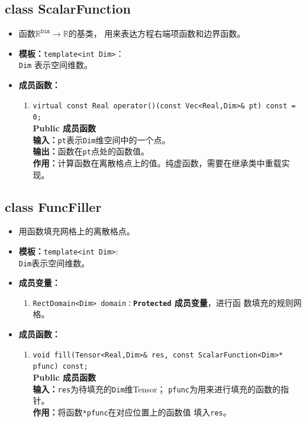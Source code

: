 \documentclass[a4paper,twoside]{ctexart}
\begin{document}
\subsection*{class ScalarFunction}
\begin{itemize}
    \item 函数$\mathbb{R}^{\texttt{Dim}}\rightarrow\mathbb{R}$的基类，
      用来表达方程右端项函数和边界函数。
    \item \textbf{模板：}\texttt{template<int Dim>}：\\\texttt{Dim} 表示空间维数。
    \item \textbf{成员函数：}
            \begin{enumerate}[(1)]
                \item \texttt{virtual const Real operator()(const Vec<Real,Dim>\& pt) const = 0;}\\
                \textbf{Public 成员函数}\\
                \textbf{输入：}\texttt{pt}表示\texttt{Dim}维空间中的一个点。\\
                \textbf{输出：}函数在\texttt{pt}点处的函数值。\\
                \textbf{作用：}计算函数在离散格点上的值。纯虚函数，需要在继承类中重载实现。
         
            \end{enumerate}
\end{itemize}

\subsection*{class FuncFiller}
\begin{itemize}
    \item 用函数填充网格上的离散格点。
    \item \textbf{模板：}\texttt{template<int Dim>}:\\
      \texttt{Dim}表示空间维数。
      \item \textbf{成员变量：}
        \begin{enumerate}[(1)]
            \item \texttt{RectDomain<Dim>
                domain：}\textbf{\texttt{Protected}  成员变量}，进行函
              数填充的规则网格。
        \end{enumerate}
    \item \textbf{成员函数：}
            \begin{enumerate}[(1)]
                \item \texttt{void fill(Tensor<Real,Dim>\& res, const ScalarFunction<Dim>* pfunc) const;}\\
                \textbf{Public 成员函数}\\
                \textbf{输入：}\texttt{res}为待填充的\texttt{Dim}维Tensor；
                \texttt{pfunc}为用来进行填充的函数的指针。\\
                \textbf{作用：}将函数\texttt{*pfunc}在对应位置上的函数值
                填入\texttt{res}。
            \end{enumerate}
\end{itemize}
\end{document}
